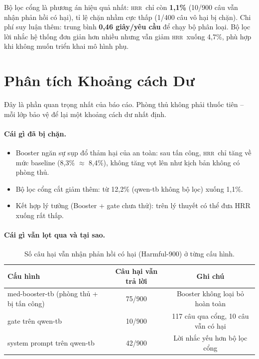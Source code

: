 \documentclass[11pt]{article}
\newenvironment{compactitem}{\begin{itemize}\setlength{\itemsep}{1pt}\setlength{\parskip}{0pt}}{\end{itemize}}
\newcommand{\HRR}{\textsc{hrr}}   %
\begin{document}
Bộ lọc cổng là phương án hiệu quả nhất: \HRR\ chỉ còn \textbf{1,1\%} (10/900 câu vẫn nhận phản
hồi có hại), tỉ lệ chặn nhầm cực thấp (1/400 câu vô hại bị chặn). Chi phí suy luận thêm: trung
bình \textbf{0,46 giây/yêu cầu} để chạy bộ phân loại. Bộ lọc lời nhắc hệ thống đơn giản hơn
nhiều nhưng vẫn giảm \HRR\ xuống 4,7\%, phù hợp khi không muốn triển khai mô hình phụ.

\section{Phân tích Khoảng cách Dư}
\label{sec:residual}

Đây là phần quan trọng nhất của báo cáo. Phòng thủ không phải thuốc tiên -- mỗi lớp bảo vệ để
lại một khoảng cách dư nhất định.

\paragraph{Cái gì đã bị chặn.}
\begin{compactitem}
  \item Booster ngăn sự sụp đổ thảm hại của an toàn: sau tấn công, \HRR\ chỉ tăng về mức baseline
  (8,3\% $\approx$ 8,4\%), không tăng vọt lên như kịch bản không có phòng thủ.
  \item Bộ lọc cổng cắt giảm thêm: từ 12,2\% (qwen-tb không bộ lọc) xuống 1,1\%.
  \item Kết hợp lý tưởng (Booster + gate chưa thử): trên lý thuyết có thể đưa HRR xuống rất thấp.
\end{compactitem}

\paragraph{Cái gì vẫn lọt qua và tại sao.}

\begin{table}[h]
  \centering
  \caption{Số câu hại vẫn nhận phản hồi có hại (Harmful-900) ở từng cấu hình.}
  \label{tab:gap}
  \small
  \begin{tabular}{@{}lcc@{}}
    \toprule
    Cấu hình & Câu hại vẫn trả lời & Ghi chú \\
    \midrule
    med-booster-tb (phòng thủ + bị tấn công) & 75/900 & Booster không loại bỏ hoàn toàn \\
    gate trên qwen-tb                         & 10/900 & 117 câu qua cổng, 10 câu vẫn có hại \\
    system prompt trên qwen-tb                & 42/900 & Lời nhắc yếu hơn bộ lọc cổng \\
    \bottomrule
  \end{tabular}
\end{table}
\end{document}
